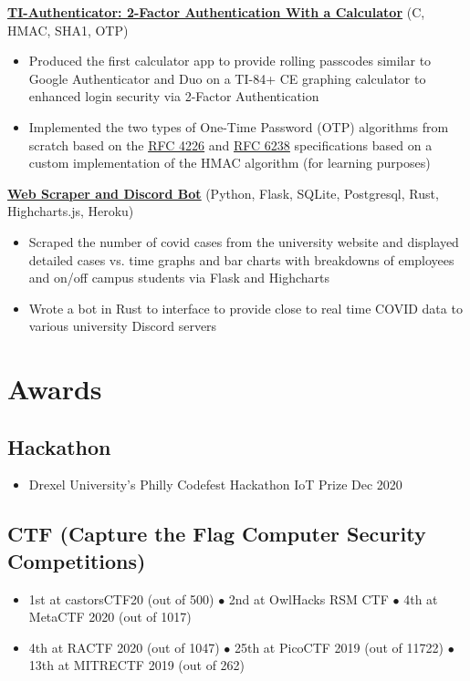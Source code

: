 \documentclass{article}
\begin{document}
\textbf{\href{https://github.com/jshin313/ti-authenticator}{\underline{TI-Authenticator: 2-Factor Authentication With a Calculator}}} \hfill (C, HMAC, SHA1, OTP)
\begin{itemize}
    \item Produced the first calculator app to provide rolling passcodes similar to Google Authenticator and Duo on a TI-84+ CE graphing calculator to enhanced login security via 2-Factor Authentication
    \item Implemented the two types of One-Time Password (OTP) algorithms from scratch based on the \href{https://tools.ietf.org/html/rfc4226}{\underline{RFC 4226}} and \href{https://tools.ietf.org/html/rfc6238}{\underline{RFC 6238}} specifications based on a custom implementation of the HMAC algorithm (for learning purposes)
\end{itemize}

\textbf{\href{https://github.com/jshin313/unofficial-temple-covid-live-dashboard}{\underline{Web Scraper and Discord Bot}}} \hfill (Python, Flask, SQLite, Postgresql, Rust, Highcharts.js, Heroku)
\begin{itemize}
    \item Scraped the number of covid cases from the university website and displayed detailed cases vs. time graphs and bar charts with breakdowns of employees and on/off campus students via Flask and Highcharts
    \item Wrote a bot in Rust to interface to provide close to real time COVID data to various university Discord servers
\end{itemize}

\section{Awards}
\subsection{Hackathon}
\begin{itemize}
    \item Drexel University's Philly Codefest Hackathon IoT Prize \hfill Dec 2020
\end{itemize}
\subsection{CTF (Capture the Flag Computer Security Competitions)}
\begin{itemize}
    \item 1st at castorsCTF20 (out of 500) $\bullet$ 2nd at OwlHacks RSM CTF $\bullet$ 4th at MetaCTF 2020 (out of 1017) 
    \item 4th at RACTF 2020 (out of 1047) $\bullet$ 25th at PicoCTF 2019 (out of 11722) $\bullet$ 13th at MITRECTF 2019 (out of 262)
\end{itemize}
\end{document}
